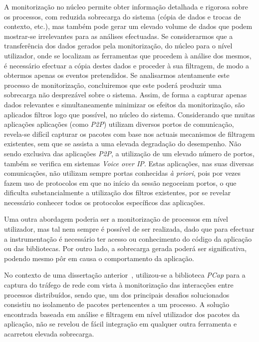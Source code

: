 A monitorização no núcleo permite obter informação detalhada e rigorosa sobre os processos, com reduzida sobrecarga do sistema (cópia de dados e trocas de contexto, etc.), mas também pode gerar um elevado volume de dados que podem mostrar-se irrelevantes para as análises efectuadas.
Se considerarmos que a transferência dos dados gerados pela monitorização, do núcleo para o nível utilizador, onde se localizam as ferramentas que procedem à análise dos mesmos, é necessário efectuar a cópia destes dados e proceder à sua filtragem, de modo a obtermos apenas os eventos pretendidos.
Se analisarmos atentamente este processo de monitorização, concluiremos que este poderá produzir uma sobrecarga não desprezável sobre o sistema.
Assim, de forma a capturar apenas dados relevantes e simultaneamente minimizar os efeitos da monitorização, são aplicados filtros logo que possível, no núcleo do sistema.
Considerando que muitas aplicações aplicações (como \textit{P2P}) utilizam diversos portos de comunicação, revela-se difícil capturar os pacotes com base nos actuais mecanismos de filtragem existentes, sem que se assista a uma elevada degradação do desempenho.
Não sendo exclusiva das aplicações \textit{P2P}, a utilização de um elevado número de portos, também se verifica em sistemas \textit{Voice over IP}.
Estas aplicações, nas suas diversas comunicações, não utilizam sempre portas conhecidas \textit{à priori}, pois por vezes fazem uso de protocolos em que no início da sessão negoceiam portos, o que dificulta substancialmente a utilização dos filtros existentes, por se revelar necessário conhecer todos os protocolos específicos das aplicações.


Uma outra abordagem poderia ser a monitorização de processos em nível utilizador, mas tal nem sempre é possível de ser realizada, dado que para efectuar a instrumentação é necessário ter acesso ou conhecimento do código da aplicação ou das bibliotecas.
Por outro lado, a sobrecarga gerada poderá ser significativa, podendo mesmo pôr em causa o comportamento da aplicação.

No contexto de uma dissertação anterior~\cite{Farruca:2009}, utilizou-se a biblioteca \textit{PCap} para a captura do tráfego de rede com vista à monitorização das interacções entre processos distribuídos, sendo que, um dos principais desafios solucionados consistiu no isolamento de pacotes pertencentes a um processo.
A solução encontrada baseada em análise e filtragem em nível utilizador dos pacotes da aplicação, não se revelou de fácil integração em qualquer outra ferramenta e acarretou elevada sobrecarga.


